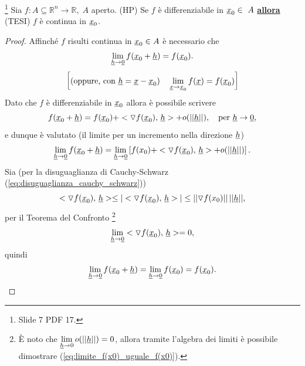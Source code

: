\begin{property}\footnote{Slide 7 PDF 17.}
	Sia $f:A\subseteq\mathbb{R}^n\rightarrow\mathbb{R},\; A$ aperto. (HP) Se $f$ è differenziabile in $\uline x_0\in\ A$ \textbf{\ul{allora}} (TESI) $f$ è continua in $\uline x_0$.
\end{property}
\begin{proof}
	Affinché $f$ risulti continua in $\uline x_0\in A$ è necessario che
	\begin{equation*}
		\lim\limits_{\uline h\rightarrow \uline 0} f(\uline x_0 + \uline h) = f(\uline x_0).
	\end{equation*} 
	\begin{equation*}
		\left[\text{(oppure, con } \uline h = \uline x - \uline x_0)\quad\lim\limits_{\uline x\rightarrow \uline x_0} f(\uline x) = f(\uline x_0)\right]
	\end{equation*}
	Dato che $f$ è differenziabile in $\uline x_0$ allora è possibile scrivere
	\begin{equation*}
		f(\uline x_0+\uline h)=f(\uline x_0) + <\triangledown f(\uline x_0),\, \uline h> + o(||\uline h||),\quad\text{per }\uline h\rightarrow\uline 0,
	\end{equation*}
	e dunque è valutato (il limite per un incremento nella direzione $\uline h$)
	\begin{equation*}
		\lim\limits_{\uline h\rightarrow \uline 0} f(\uline x_0 + \uline h) = \lim\limits_{\uline h\rightarrow\uline 0} \left[f(x_0) + <\triangledown f(\uline x_0),\, \uline  h> + o(||\uline h||)\right].
	\end{equation*}
	Sia (per la disuguaglianza di Cauchy-Schwarz (\ref{eq:disuguaglianza_cauchy_schwarz}))
	\begin{equation*}
		<\triangledown f(\uline x_0),\, \uline h>\leq |<\triangledown f(\uline x_0),\, \uline h>|\leq ||\triangledown f(x_0)||\,||\uline h||,
	\end{equation*}
	per il Teorema del Confronto \footnote{È noto che $\lim\limits_{\uline h\rightarrow 0}o(||\uline h||)=0$, allora tramite l'algebra dei limiti è possibile dimostrare (\ref{eq:limite_f(x0)_uguale_f(x0)}).}
	\begin{equation*}
		\lim\limits_{\uline h\rightarrow\uline 0} <\triangledown f(\uline x_0),\, \uline h>=0,
	\end{equation*}
	quindi
	\begin{equation}\label{eq:limite_f(x0)_uguale_f(x0)}
			\lim\limits_{\uline h\rightarrow \uline 0} f(\uline x_0 + \uline h) = 	\lim\limits_{\uline h\rightarrow \uline 0} f(\uline x_0) = f(\uline x_0).
	\end{equation}
\end{proof}

